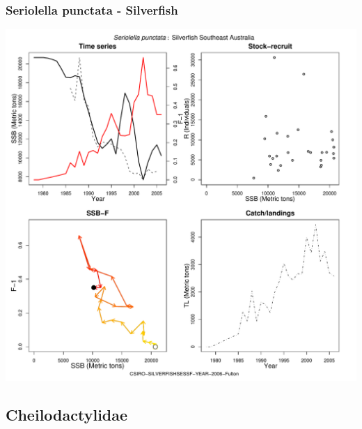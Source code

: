 \subsubsection{Seriolella punctata - Silverfish}
\begin{center}
\includegraphics[width=1.2\textwidth]{../R/figures/CSIRO-SILVERFISHSESSF-YEAR-2006-Fulton.pdf}
\end{center}

\subsection{Cheilodactylidae}

